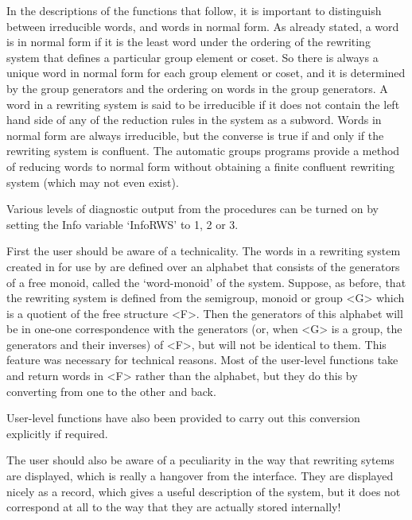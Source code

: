 In the descriptions of the  functions that follow,  it is important to
distinguish between  irreducible words, and  words in normal form.  As
already stated, a word is in normal form if it is the least word under
the ordering of the  rewriting system that  defines a particular group
element or coset.  So  there is always  a unique word in  normal form
for each group element or coset,  and it is  determined by the  group
generators and the
ordering on words  in  the group   generators. A word  in a  rewriting
system is said to be irreducible if it  does not contain the left hand
side of any of the reduction  rules in the  system as a subword. Words
in normal form are always irreducible, but the converse is true if and
only   if  the rewriting system  is   confluent.  The automatic groups
programs provide a  method of  reducing  words to normal  form without
obtaining a  finite  confluent rewriting  system  (which may  not even
exist).

Various levels of diagnostic  output  from the {\GAP}  procedures   can
be turned on  by
setting the Info variable  `InfoRWS'  to 1, 2 or 3.



First the user should be aware of a technicality. The words in a
rewriting system created in {\GAP} for use by {\KBMAG} are defined over an
alphabet that consists of the generators of a free monoid, called the
`word-monoid' of the system. Suppose, as before,  that the rewriting system
is defined from the semigroup, monoid or group <G> which is a quotient of
the free structure <F>. Then the generators of this alphabet will be  in
one-one correspondence with the generators (or, when <G> is a group, the
generators and their inverses) of <F>, but will not be identical to them.
This feature was necessary for technical reasons. Most of the user-level
functions take and return words in <F> rather than the alphabet, but
they do this by converting from one to the other and back.

User-level functions have also been provided to carry out this
conversion explicitly if required. 

The user should also be aware of a peculiarity in the way that
rewriting sytems are displayed, which is really a hangover from
the  interface. They are displayed nicely as a record, which gives
a useful description of the system, but it does not correspond at
all to the way that they are actually stored internally!

